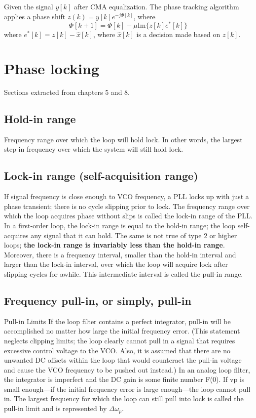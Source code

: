 \documentclass[a4paper]{article}
\begin{document}
Given the signal $y[k]$ after CMA equalization. The phase tracking algorithm applies a phase shift $z(k) = y[k]e^{-j\Phi[k]}$, where
\begin{equation}
\Phi[k+1] = \Phi[k]-\mu\mathrm{Im}\{z[k]e^*[k]\}
\end{equation}
where $e^*[k] = z[k] - \hat{x}[k]$, where $\hat{x}[k]$ is a decision made based on $z[k]$.

\section{Phase locking}
Sections extracted from \cite{Gardner} chapters 5 and 8. 

\subsection{Hold-in range}
Frequency range over which the loop will hold lock. In other words, the largest step in frequency over which the system will still hold lock.	

\subsection{Lock-in range (self-acquisition range)}

If signal frequency is close enough to VCO frequency, a PLL locks up with
just a phase transient; there is no cycle slipping prior to lock. The frequency range over which the loop acquires phase without slips is called the lock-in range of the PLL. In a first-order loop, the lock-in range is equal to the hold-in range; the loop self-acquires any signal that it can hold. The same is not true of type 2 or higher loops; \textbf{the lock-in range is invariably less than the hold-in range}. Moreover, there is a frequency interval, smaller than the hold-in interval
and larger than the lock-in interval, over which the loop will acquire lock after slipping cycles for awhile. This intermediate interval is called the pull-in range.

\subsection{Frequency pull-in, or simply, pull-in}

Pull-in Limits If the loop filter contains a perfect integrator, pull-in will be accomplished no matter how large the initial frequency error. (This statement neglects clipping limits; the loop clearly cannot pull in a signal that requires excessive control voltage to the VCO. Also, it is assumed that there are no unwanted DC offsets within the loop that would counteract the pull-in voltage and cause the VCO frequency to be pushed out instead.) In an analog loop filter, the integrator is imperfect and the DC gain is some finite number F(0). If vp is small enough—if the initial frequency error is large enough—the loop cannot pull in. The largest frequency for which the loop can still pull into lock is called the pull-in limit and is represented by $\Delta\omega_p$.
\end{document}
